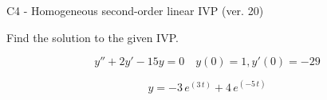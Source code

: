 \begin{exercise}
  \begin{exerciseTitle}C4 - Homogeneous second-order linear IVP (ver. 20)\end{exerciseTitle}
  \begin{exerciseStatement}
    
Find the solution to the given IVP.

    
\[y''+2y'-15y = 0 \hspace{1em} y(0) = 1 , y'(0) = -29\]

  \end{exerciseStatement}
  \begin{exerciseAnswer}
    
\[y= -3 \, e^{\left(3 \, t\right)} + 4 \, e^{\left(-5 \, t\right)}\]

  \end{exerciseAnswer}
\end{exercise}